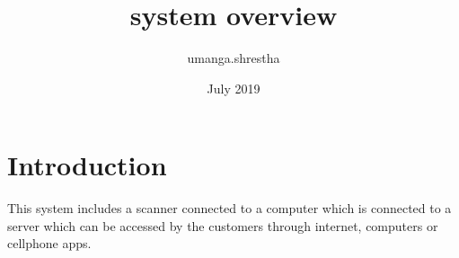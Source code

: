 \documentclass{article}
\title{system overview}
\author{umanga.shrestha }
\date{July 2019}
\begin{document}
\maketitle

\section{Introduction}

This system includes a scanner connected to a computer which is connected to a server which can be accessed by the customers through internet, computers or cellphone apps.
\end{document}
